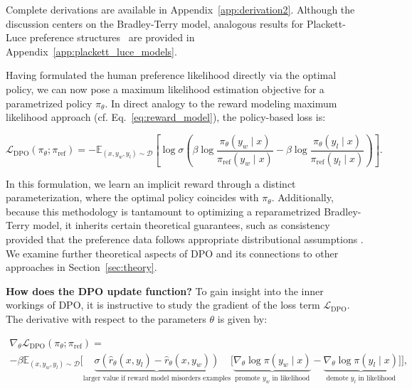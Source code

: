 Complete derivations are available in Appendix~\ref{app:derivation2}. Although the discussion centers on the Bradley-Terry model, analogous results for Plackett-Luce preference structures~\citep{plackett1975analysis, luce2012individual} are provided in Appendix~\ref{app:plackett_luce_models}.

Having formulated the human preference likelihood directly via the optimal policy, we can now pose a maximum likelihood estimation objective for a parametrized policy $\pi_\theta$. In direct analogy to the reward modeling maximum likelihood approach (cf. Eq.~\ref{eq:reward_model}), the policy-based loss is:

\begin{equation}\label{eq:optimum_model}
    \mathcal{L}_\text{DPO}(\pi_{\theta}; \pi_\text{ref}) = -\mathbb{E}_{(x, y_w, y_l)\sim \mathcal{D}}\left[\log \sigma \left(\beta \log \frac{\pi_{\theta}(y_w\mid x)}{\pi_\text{ref}(y_w\mid x)} - \beta \log \frac{\pi_{\theta}(y_l\mid x)}{\pi_\text{ref}(y_l\mid x)}\right)\right].
\end{equation}

In this formulation, we learn an implicit reward through a distinct parameterization, where the optimal policy coincides with $\pi_\theta$. Additionally, because this methodology is tantamount to optimizing a reparametrized Bradley-Terry model, it inherits certain theoretical guarantees, such as consistency provided that the preference data follows appropriate distributional assumptions \cite{bong2022generalized}. We examine further theoretical aspects of DPO and its connections to other approaches in Section~\ref{sec:theory}.

\textbf{How does the DPO update function?} To gain insight into the inner workings of DPO, it is instructive to study the gradient of the loss term $\mathcal{L}_\text{DPO}$. The derivative with respect to the parameters $\theta$ is given by:

\begin{multline*}\label{eq:gradient}
    \nabla_\theta \mathcal{L}_\text{DPO}(\pi_\theta;\pi_\text{ref}) = \\ -\beta\mathbb{E}_{(x, y_w, y_l) \sim \mathcal{D}} \bigg[\underbrace{\sigma(\hat{r}_\theta(x, y_l) - \hat{r}_\theta (x, y_w))}_\text{larger value if reward model misorders examples}\bigg[\underbrace{\nabla_\theta\log \pi(y_w \mid x)}_\text{promote $y_w$ in likelihood} - \underbrace{\nabla_\theta\log\pi(y_l \mid x)}_\text{demote $y_l$ in likelihood}\bigg]\bigg],
\end{multline*}

